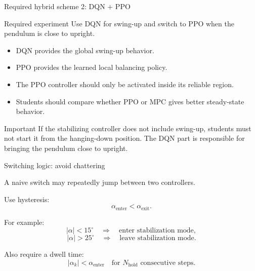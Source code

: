 \documentclass[aspectratio=169]{beamer}
\begin{document}
\begin{frame}{Required hybrid scheme 2: DQN + PPO}

\begin{block}{Required experiment}
\small
Use DQN for swing-up and switch to PPO when the pendulum is close to upright.
\end{block}



\begin{itemize}
    \item DQN provides the global swing-up behavior.
    \vspace{0.18cm}
    \item PPO provides the learned local balancing policy.
    \vspace{0.18cm}
    \item The PPO controller should only be activated inside its reliable region.
    \vspace{0.18cm}
    \item Students should compare whether PPO or MPC gives better steady-state behavior.
\end{itemize}



\begin{alertblock}{Important}
\small
If the stabilizing controller does not include swing-up, students must not start it from the hanging-down position.
The DQN part is responsible for bringing the pendulum close to upright.
\end{alertblock}

\end{frame}

\begin{frame}{Switching logic: avoid chattering}

A naive switch may repeatedly jump between two controllers.

\vspace{0.2cm}

Use hysteresis:
\[
\alpha_{\mathrm{enter}} < \alpha_{\mathrm{exit}}.
\]

\vspace{0.15cm}

For example:
\[
|\alpha|<15^\circ
\quad \Rightarrow \quad
\text{enter stabilization mode},
\]
\[
|\alpha|>25^\circ
\quad \Rightarrow \quad
\text{leave stabilization mode}.
\]

\vspace{0.15cm}

Also require a dwell time:
\[
|\alpha_k|<\alpha_{\mathrm{enter}}
\quad \text{for } N_{\mathrm{hold}} \text{ consecutive steps}.
\]

\vspace{0.1cm}



\end{frame}
\end{document}
